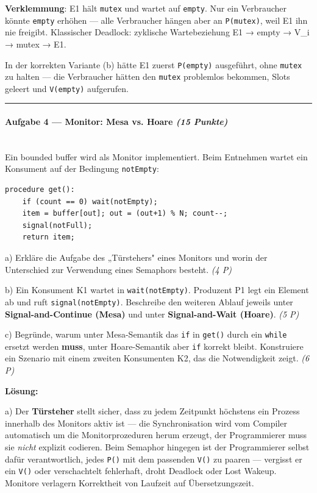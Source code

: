 \documentclass[11pt, a4paper]{article}
\begin{document}
\textbf{Verklemmung}: E1 hält \texttt{mutex} und wartet auf \texttt{empty}. Nur ein Verbraucher könnte \texttt{empty} erhöhen — alle Verbraucher hängen aber an \texttt{P(mutex)}, weil E1 ihn nie freigibt. Klassischer Deadlock: zyklische Wartebeziehung E1 → empty → V\_i → mutex → E1.


In der korrekten Variante (b) hätte E1 zuerst \texttt{P(empty)} ausgeführt, ohne \texttt{mutex} zu halten — die Verbraucher hätten den \texttt{mutex} problemlos bekommen, Slots geleert und \texttt{V(empty)} aufgerufen.



\noindent\textcolor{rulegray}{\rule{\linewidth}{0.4pt}}


\paragraph{Aufgabe 4 — Monitor: Mesa vs. Hoare \textit{(15 Punkte)}}\mbox{}\\[2pt]

Ein bounded buffer wird als Monitor implementiert. Beim Entnehmen wartet ein Konsument auf der Bedingung \texttt{notEmpty}:


\begin{lstlisting}
procedure get():
    if (count == 0) wait(notEmpty);
    item = buffer[out]; out = (out+1) % N; count--;
    signal(notFull);
    return item;
\end{lstlisting}


a) Erkläre die Aufgabe des „Türstehers" eines Monitors und worin der Unterschied zur Verwendung eines Semaphors besteht. \textit{(4 P)}


b) Ein Konsument K1 wartet in \texttt{wait(notEmpty)}. Produzent P1 legt ein Element ab und ruft \texttt{signal(notEmpty)}. Beschreibe den weiteren Ablauf jeweils unter \textbf{Signal-and-Continue (Mesa)} und unter \textbf{Signal-and-Wait (Hoare)}. \textit{(5 P)}


c) Begründe, warum unter Mesa-Semantik das \texttt{if} in \texttt{get()} durch ein \texttt{while} ersetzt werden \textbf{muss}, unter Hoare-Semantik aber \texttt{if} korrekt bleibt. Konstruiere ein Szenario mit einem zweiten Konsumenten K2, das die Notwendigkeit zeigt. \textit{(6 P)}


\textbf{Lösung:}


a) Der \textbf{Türsteher} stellt sicher, dass zu jedem Zeitpunkt höchstens ein Prozess innerhalb des Monitors aktiv ist — die Synchronisation wird vom Compiler automatisch um die Monitorprozeduren herum erzeugt, der Programmierer muss sie \textit{nicht} explizit codieren. Beim Semaphor hingegen ist der Programmierer selbst dafür verantwortlich, jedes \texttt{P()} mit dem passenden \texttt{V()} zu paaren — vergisst er ein \texttt{V()} oder verschachtelt fehlerhaft, droht Deadlock oder Lost Wakeup. Monitore verlagern Korrektheit von Laufzeit auf Übersetzungszeit.
\end{document}
